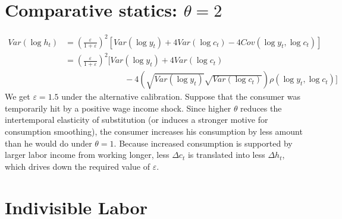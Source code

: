 \documentclass[12pt]{amsart}
\begin{document}
\section{Comparative statics: $\theta = 2$}
\begin{align*}
Var(\log h_t) & = \left( \frac{\varepsilon}{1+ \varepsilon}\right)^2 \left[ Var(\log y_t) +  4 Var(\log c_t) - 4 Cov(\log y_t, \log c_t) \right] \\
& = \left( \frac{\varepsilon}{1+ \varepsilon}\right)^2 \Bigg[ Var(\log y_t) + 4 Var(\log c_t) \\
& \hspace{3cm} - 4 \left( \sqrt{Var(\log y_t)} \sqrt{Var(\log c_t)} \right)\rho(\log y_t, \log c_t) \Bigg]
\end{align*}
We get $\varepsilon = 1.5$ under the alternative calibration. Suppose that the consumer was temporarily hit by a positive wage income shock. Since higher $\theta$ reduces the intertemporal elasticity of substitution (or induces a stronger motive for consumption smoothing), the consumer increases his consumption by less amount than he would do under $\theta=1$.  Because increased consumption is supported by larger labor income from working longer, less $\Delta c_t$ is translated into less $\Delta h_t$, which drives down the required value of $\varepsilon$. 
\section{Indivisible Labor}
\end{document}
